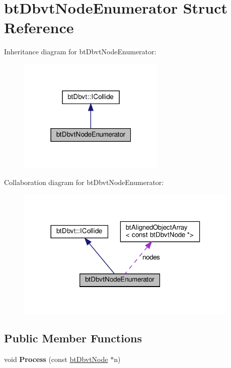 \hypertarget{structbtDbvtNodeEnumerator}{}\section{bt\+Dbvt\+Node\+Enumerator Struct Reference}
\label{structbtDbvtNodeEnumerator}


Inheritance diagram for bt\+Dbvt\+Node\+Enumerator\+:
\nopagebreak
\begin{figure}[H]
\begin{center}
\leavevmode
\includegraphics[width=199pt]{structbtDbvtNodeEnumerator__inherit__graph}
\end{center}
\end{figure}


Collaboration diagram for bt\+Dbvt\+Node\+Enumerator\+:
\nopagebreak
\begin{figure}[H]
\begin{center}
\leavevmode
\includegraphics[width=302pt]{structbtDbvtNodeEnumerator__coll__graph}
\end{center}
\end{figure}
\subsection*{Public Member Functions}
\begin{DoxyCompactItemize}
\item 
\mbox{\label{structbtDbvtNodeEnumerator_add4f018f474f3471311b29feaa85ea62}} 
void {\bfseries Process} (const \hyperlink{structbtDbvtNode}{bt\+Dbvt\+Node} $\ast$n)
\end{DoxyCompactItemize}
